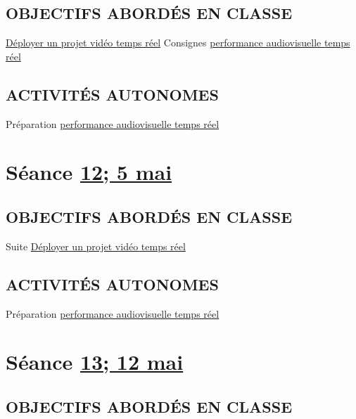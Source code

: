\documentclass[
]{book}
\begin{document}
\hypertarget{objectifs-aborduxe9s-en-classe-12}{%
\subsection{OBJECTIFS ABORDÉS EN CLASSE}\label{objectifs-aborduxe9s-en-classe-12}}

\protect\hyperlink{deployer}{Déployer un projet vidéo temps réel} Consignes \protect\hyperlink{sommatif_5}{performance audiovisuelle temps réel}

\hypertarget{activituxe9s-autonomes-12}{%
\subsection{ACTIVITÉS AUTONOMES}\label{activituxe9s-autonomes-12}}

Préparation \protect\hyperlink{sommatif_5}{performance audiovisuelle temps réel}

\hypertarget{semaine_14}{%
\section{\texorpdfstring{Séance \protect\hyperlink{semaine_14}{12; 5 mai}}{Séance 12; 5 mai}}\label{semaine_14}}

\hypertarget{objectifs-aborduxe9s-en-classe-13}{%
\subsection{OBJECTIFS ABORDÉS EN CLASSE}\label{objectifs-aborduxe9s-en-classe-13}}

Suite \protect\hyperlink{deployer}{Déployer un projet vidéo temps réel}

\hypertarget{activituxe9s-autonomes-13}{%
\subsection{ACTIVITÉS AUTONOMES}\label{activituxe9s-autonomes-13}}

Préparation \protect\hyperlink{sommatif_5}{performance audiovisuelle temps réel}

\hypertarget{semaine_15}{%
\section{\texorpdfstring{Séance \protect\hyperlink{semaine_15}{13; 12 mai}}{Séance 13; 12 mai}}\label{semaine_15}}

\hypertarget{objectifs-aborduxe9s-en-classe-14}{%
\subsection{OBJECTIFS ABORDÉS EN CLASSE}\label{objectifs-aborduxe9s-en-classe-14}}
\end{document}
